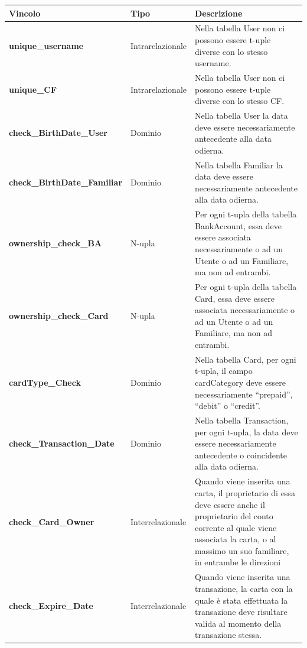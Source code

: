 \begin{longtable}{m{5.2cm}|m{2.8cm}|m{5.3cm}}
    
    \rowcolor{black!10}
    \textbf{Vincolo} & \textbf{Tipo} & \textbf{Descrizione} \\ \hline
    \endhead

    \raggedright \textbf{unique\_username} & \raggedright Intrarelazionale &
    Nella tabella User non ci possono essere t-uple diverse con lo stesso username. \\ \hline

    \raggedright \textbf{unique\_CF} & \raggedright Intrarelazionale &
    Nella tabella User non ci possono essere t-uple diverse con lo stesso CF. \\ \hline

    \raggedright \textbf{check\_BirthDate\_User} & \raggedright Dominio &
    Nella tabella User la data deve essere necessariamente antecedente alla data odierna. \\ \hline

    \raggedright \textbf{check\_BirthDate\_Familiar} & \raggedright Dominio &
    Nella tabella Familiar la data deve essere necessariamente antecedente alla data odierna. \\ \hline

    \raggedright \textbf{ownership\_check\_BA} & \raggedright N-upla &
    Per ogni t-upla della tabella BankAccount, essa deve essere associata necessariamente o ad un Utente o ad un Familiare, ma non ad entrambi. \\ \hline

    \raggedright \textbf{ownership\_check\_Card} & \raggedright N-upla &
    Per ogni t-upla della tabella Card, essa deve essere associata necessariamente o ad un Utente o ad un Familiare, ma non ad entrambi. \\ \hline

    \raggedright \textbf{cardType\_Check} & \raggedright Dominio &
    Nella tabella Card, per ogni t-upla, il campo cardCategory deve essere necessariamente “prepaid”, “debit” o “credit”. \\ \hline

    \raggedright \textbf{check\_Transaction\_Date} & \raggedright Dominio &
    Nella tabella Transaction, per ogni t-upla, la data deve essere necessariamente antecedente o coincidente alla data odierna. \\ \hline

    \raggedright \textbf{check\_Card\_Owner} & \raggedright Interrelazionale &
    Quando viene inserita una carta, il proprietario di essa deve essere anche il proprietario del conto corrente al quale viene associata la carta, o al massimo un suo familiare, in entrambe le direzioni \\ \hline

    \raggedright \textbf{check\_Expire\_Date} & \raggedright Interrelazionale &
    Quando viene inserita una transazione, la carta con la quale è stata effettuata la transazione deve risultare valida al momento della transazione stessa. \\ \hline

\end{longtable}